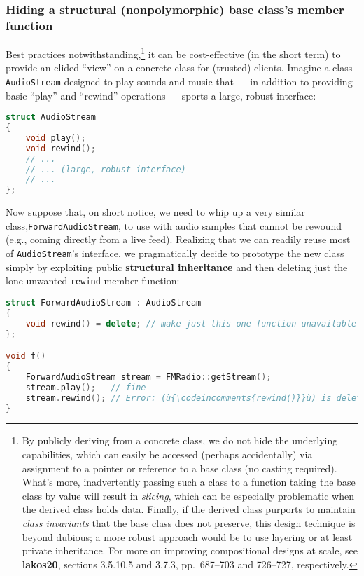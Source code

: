 \subsubsection[Hiding a structural (nonpolymorphic) base class's member function]{Hiding a structural (nonpolymorphic) base class’s member function}\label{hiding-a-structural-(nonpolymorphic)-base-class's-member-function}

Best practices notwithstanding,{\cprotect\footnote{By publicly deriving
from a concrete class, we do not hide the underlying capabilities,
which can easily be accessed (perhaps accidentally) via assignment to
a pointer or reference to a base class (no casting required). What's
more, inadvertently passing such a class to a function taking the base
class by value will result in \emph{slicing}, which can be especially
problematic when the derived class holds data. Finally, if the derived
class purports to maintain \emph{class invariants} that the base class
does not preserve, this design technique is beyond dubious; a more
robust approach would be to use layering or at least private
inheritance. For more on improving compositional designs at scale, see
  \textbf{{lakos20}}, sections 3.5.10.5 and 3.7.3, pp.~687--703 and
  726--727, respectively.}} it can be cost-effective (in the short
term) to provide an elided ``view'' on a concrete class for (trusted)
clients. Imagine a class \texttt{AudioStream} designed to play sounds
and music that --- in addition to providing basic ``play'' and
``rewind'' operations --- sports a large, robust interface:

\begin{lstlisting}[language=C++]
struct AudioStream
{
    void play();
    void rewind();
    // ...
    // ... (large, robust interface)
    // ...
};
\end{lstlisting}
    

Now suppose that, on short notice, we need to whip up a very similar
class,\linebreak[4] \texttt{ForwardAudioStream}, to use with audio samples that
cannot be rewound (e.g., coming directly from a live feed). Realizing
that we can readily reuse most of \texttt{AudioStream}'s interface, we
pragmatically decide to prototype the new class simply by exploiting
public \textbf{structural inheritance} and then deleting just the lone
unwanted \texttt{rewind} member function:

\begin{lstlisting}[language=C++]
struct ForwardAudioStream : AudioStream
{
    void rewind() = delete; // make just this one function unavailable
};

void f()
{
    ForwardAudioStream stream = FMRadio::getStream();
    stream.play();   // fine
    stream.rewind(); // Error: (ù{\codeincomments{rewind()}}ù) is deleted.
}
\end{lstlisting}
    
